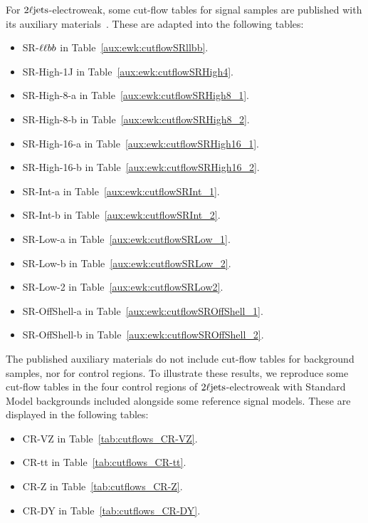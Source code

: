 For $2\ell\mathrm{jets}$-electroweak, some cut-flow tables for signal samples are
published with its auxiliary materials~\cite{hepdata.116034}.
These are adapted into the following tables:
\begin{itemize}
\item SR-$\ell\ell bb$ in Table~\ref{aux:ewk:cutflowSRllbb}.
\item SR-High-1J in Table~\ref{aux:ewk:cutflowSRHigh4}.
\item SR-High-8-a in Table~\ref{aux:ewk:cutflowSRHigh8_1}.
\item SR-High-8-b in Table~\ref{aux:ewk:cutflowSRHigh8_2}.
\item SR-High-16-a in Table~\ref{aux:ewk:cutflowSRHigh16_1}.
\item SR-High-16-b in Table~\ref{aux:ewk:cutflowSRHigh16_2}.
\item SR-Int-a in Table~\ref{aux:ewk:cutflowSRInt_1}.
\item SR-Int-b in Table~\ref{aux:ewk:cutflowSRInt_2}.
\item SR-Low-a in Table~\ref{aux:ewk:cutflowSRLow_1}.
\item SR-Low-b in Table~\ref{aux:ewk:cutflowSRLow_2}.
\item SR-Low-2 in Table~\ref{aux:ewk:cutflowSRLow2}.
\item SR-OffShell-a in Table~\ref{aux:ewk:cutflowSROffShell_1}.
\item SR-OffShell-b in Table~\ref{aux:ewk:cutflowSROffShell_2}.
\end{itemize}
The published auxiliary materials do not include cut-flow tables for background
samples, nor for control regions.
To illustrate these results, we reproduce some cut-flow tables in the four
control regions of $2\ell\mathrm{jets}$-electroweak with Standard Model backgrounds
included alongside some reference signal models.
These are displayed in the following tables:
\begin{itemize}
\item CR-VZ in Table~\ref{tab:cutflows_CR-VZ}.
\item CR-tt in Table~\ref{tab:cutflows_CR-tt}.
\item CR-Z in Table~\ref{tab:cutflows_CR-Z}.
\item CR-DY in Table~\ref{tab:cutflows_CR-DY}.
\end{itemize}

\FloatBarrier

